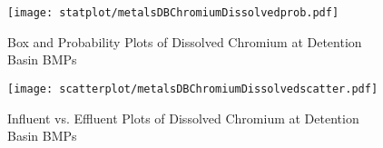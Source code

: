         \begin{figure}[hb]   %
            \centering
            \texttt{[image: statplot/metalsDBChromiumDissolvedprob.pdf]}
            \caption{Box and Probability Plots of Dissolved Chromium at Detention Basin BMPs}
        \end{figure}         %
        
        
        \begin{figure}[hb]   %
            \centering
            \texttt{[image: scatterplot/metalsDBChromiumDissolvedscatter.pdf]}
            \caption{Influent vs. Effluent Plots of Dissolved Chromium at Detention Basin BMPs}
        \end{figure}         %
        \clearpage
        